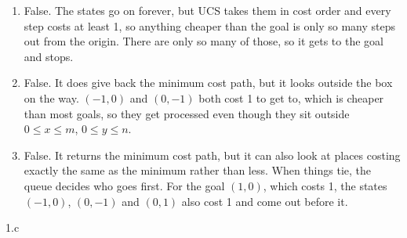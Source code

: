 \begin{answer}
  \begin{enumerate}
    \item False. The states go on forever, but UCS takes them in cost order and every step costs at
    least 1, so anything cheaper than the goal is only so many steps out from the origin. There are
    only so many of those, so it gets to the goal and stops.

    \item False. It does give back the minimum cost path, but it looks outside the box on the way.
    $(-1, 0)$ and $(0, -1)$ both cost 1 to get to, which is cheaper than most goals, so they get
    processed even though they sit outside $0 \le x \le m$, $0 \le y \le n$.

    \item False. It returns the minimum cost path, but it can also look at places costing exactly
    the same as the minimum rather than less. When things tie, the queue decides who goes first. For
    the goal $(1, 0)$, which costs 1, the states $(-1, 0)$, $(0, -1)$ and $(0, 1)$ also cost 1 and
    come out before it.
  \end{enumerate}
\end{answer}
\clearpage

\LARGE
1.c
\normalsize

